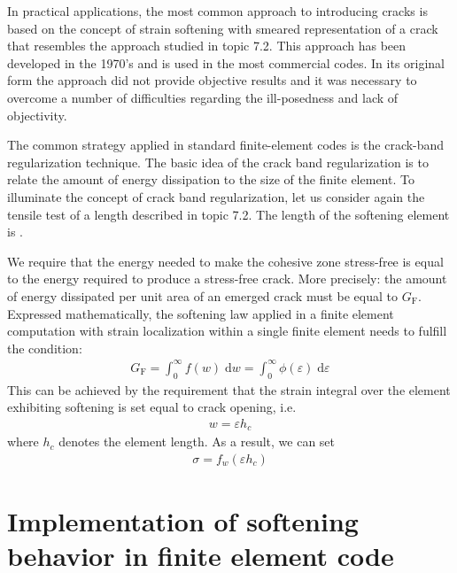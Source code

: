 \documentclass[main.tex]{subfiles}
\begin{document}
In practical applications, the most common approach to introducing cracks is based on the concept of strain softening with smeared representation of a crack that resembles the approach studied in topic 7.2. This approach has been developed in the 1970’s and is used in the most commercial codes. In its original form the approach did not provide objective results and it was necessary to overcome a number of difficulties regarding the ill-posedness and lack of objectivity.

The common strategy applied in standard finite-element codes is the crack-band regularization technique. The basic idea of the crack band regularization is to relate the amount of energy dissipation to the size of the finite element. To illuminate the concept of crack band regularization, let us consider again the tensile test of a length  described in topic 7.2. The length of the softening element is .

We require that the energy needed to make the cohesive zone stress-free is equal to the energy required to produce a stress-free crack. More precisely: the amount of energy dissipated per unit area of an emerged crack must be equal to $G_\mathrm{F}$. Expressed mathematically, the softening law applied in a finite element computation with strain localization within a single finite element needs to fulfill the condition:
\begin{align}
G_\mathrm{F} = 
\int_0^\infty 
f(w) \; \mathrm{d}w
= 
\int_0^\infty 
\phi(\varepsilon) \; 
\mathrm{d} \varepsilon
\end{align}
This can be achieved by the requirement that the strain integral over the element exhibiting softening  is set equal to crack opening, i.e.
\begin{align}
w = \varepsilon h_c
\end{align}
where $h_c$ denotes the element length.  As a result, we can set
\begin{align}
\sigma = 
f_w(\varepsilon h_c) 
\end{align}

\section{Implementation of softening behavior in finite element code}
\end{document}
